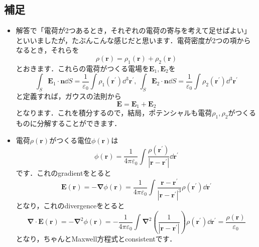 \documentclass[a4paper,pdflatex,ja=standard]{bxjsarticle}
\begin{document}
\subsection*{補足}

\begin{itemize}
  \item 
  解答で「電荷が2つあるとき，それぞれの電荷の寄与を考えて足せばよい」といいましたが，たぶんこんな感じだと思います．電荷密度が2つの項からなるとき，それらを
  \begin{equation}
    \rho(\bm{r})
    =
    \rho_1(\bm{r})
    +
    \rho_2(\bm{r})
  \end{equation}
  とおきます．これらの電荷がつくる電場を$\bm{E}_1,\bm{E}_2$を
  \begin{equation}
    \int_S
    \bm{E}_1
    \cdot
    \bm{n}
    \dd S
    =
    \frac{1}{\varepsilon_0}
    \int\rho_1(\bm{r^{\prime}})\dd^3\bm{r}^{\prime}
    ,\ 
    \int_S
    \bm{E}_2
    \cdot
    \bm{n}
    \dd S
    =
    \frac{1}{\varepsilon_0}
    \int\rho_2(\bm{r^{\prime}})\dd^3\bm{r}^{\prime}
  \end{equation}
  と定義すれば，ガウスの法則から
  \begin{equation}
    \bm{E}
    =
    \bm{E}_1
    +
    \bm{E}_2
  \end{equation}
  となります．これを積分するので，結局，ポテンシャルも電荷$\rho_1,\rho_2$がつくるものに分解することができます．

  \item 
  電荷$\rho(\bm{r})$がつくる電位$\phi(\bm{r})$は
  \begin{equation}
    \phi(\bm{r})
    =
    \frac{1}{4\pi\varepsilon_0}
    \int
    \frac{\rho(\bm{r}^{\prime})}{|\bm{r}-\bm{r}^{\prime}|}
    \dd \bm{r}^{\prime}
  \end{equation}
  です．これのgradientをとると
  \begin{equation}
    \bm{E}(\bm{r})
    =
    -
    \bm{\nabla}\phi(\bm{r})
    =
    \frac{1}{4\pi\varepsilon_0}
    \int
    \frac{\bm{r}-\bm{r}^{\prime}}{|\bm{r}-\bm{r}^{\prime}|^3}\rho(\bm{r}^{\prime})
    \dd \bm{r}^{\prime}
  \end{equation}
  となり，これのdivergenceをとると
  \begin{equation}
    \bm{\nabla}
    \cdot
    \bm{E}(\bm{r})
    =
    -
    \bm{\nabla}^2
    \phi(\bm{r})
    =
    -
    \frac{1}{4\pi\varepsilon_0}
    \int
    \bm{\nabla}^2
    \left(  
      \frac{1}{|\bm{r}-\bm{r}^{\prime}|}
    \right)\rho(\bm{r}^{\prime})
    \dd \bm{r}^{\prime}
    =
    \frac{\rho(\bm{r})}{\varepsilon_0}
  \end{equation}
  となり，ちゃんとMaxwell方程式とconsistentです．

\end{itemize}
\end{document}
